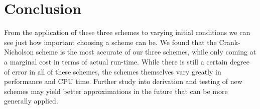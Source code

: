 \documentclass[11pt, oneside]{article}   	%
\begin{document}
\section{Conclusion}
From the application of these three schemes to varying initial conditions we can see just how important choosing a scheme can be. We found that the Crank-Nicholson scheme is the most accurate of our three schemes, while only coming at a marginal cost in terms of actual run-time. While there is still a certain degree of error in all of these schemes, the schemes themselves vary greatly in performance and CPU time. Further study into derivation and testing of new schemes may yield better approximations in the future that can be more generally applied.
\end{document}
